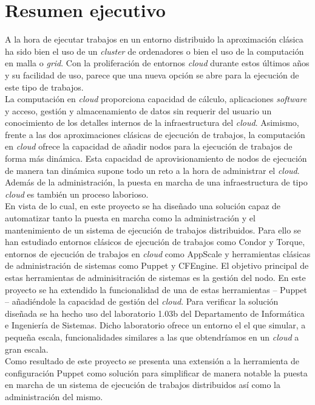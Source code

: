 \chapter{Resumen ejecutivo}
\label{cap:resumen}


A la hora de ejecutar trabajos en un entorno distribuido la aproximación clásica ha sido bien el uso de un \emph{cluster} de ordenadores o bien el uso de la computación en malla o \emph{grid}. Con la proliferación de entornos \emph{cloud} durante estos últimos años y su facilidad de uso, parece que una nueva opción se abre para la ejecución de este tipo de trabajos.\\

La computación en \emph{cloud} proporciona capacidad de cálculo, aplicaciones \emph{software} y acceso, gestión y almacenamiento de datos sin requerir del usuario un conocimiento de los detalles internos de la infraestructura del \emph{cloud}. Asimismo, frente a las dos aproximaciones clásicas de ejecución de trabajos, la computación en \emph{cloud} ofrece la capacidad de añadir nodos para la ejecución de trabajos de forma más dinámica. Esta capacidad de aprovisionamiento de nodos de ejecución de manera tan dinámica supone todo un reto a la hora de administrar el \emph{cloud}. Además de la administración, la puesta en marcha de una infraestructura de tipo \emph{cloud} es también un proceso laborioso.\\

En vista de lo cual, en este proyecto se ha diseñado una solución capaz de automatizar tanto la puesta en marcha como la administración y el mantenimiento de un sistema de ejecución de trabajos distribuidos. Para ello se han estudiado entornos clásicos de ejecución de trabajos como Condor y Torque, entornos de ejecución de trabajos en \emph{cloud} como AppScale y herramientas clásicas de administración de sistemas como Puppet y CFEngine. El objetivo principal de estas herramientas de adminisitración de sistemas es la gestión del nodo. En este proyecto se ha extendido la funcionalidad de una de estas herramientas -- Puppet -- añadiéndole la capacidad de gestión del \emph{cloud}. Para verificar la solución diseñada se ha hecho uso del laboratorio 1.03b del Departamento de Informática e Ingeniería de Sistemas. Dicho laboratorio ofrece un entorno el el que simular, a pequeña escala, funcionalidades similares a las que obtendríamos en un \emph{cloud} a gran escala.\\

Como resultado de este proyecto se presenta una extensión a la herramienta de configuración Puppet como solución para simplificar de manera notable la puesta en marcha de un sistema de ejecución de trabajos distribuidos así como la administración del mismo.
